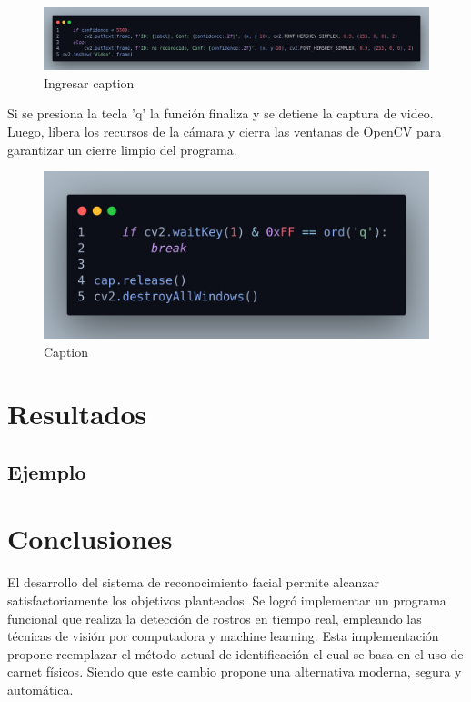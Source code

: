 \documentclass[12pt]{article}
\begin{document}
{\begin{figure}[h]
    \centering
    \includegraphics[width=1.0\linewidth]{imagenes/des26.png}
    \caption{Ingresar caption}
    \label{fig:enter-label}
\end{figure}

Si se presiona la tecla 'q' la función finaliza y se detiene la captura de video.  Luego, libera los recursos de la cámara y cierra las ventanas de OpenCV para garantizar un cierre limpio del programa.

\begin{figure}[h]
    \centering
    \includegraphics[width=0.75\linewidth]{imagenes/des27.png}
    \caption{Caption}
    \label{fig:enter-label}
\end{figure}


\section{Resultados}
\subsection{Ejemplo}


\section{Conclusiones}
El desarrollo del sistema de reconocimiento facial permite alcanzar satisfactoriamente los objetivos planteados. Se logró implementar un programa funcional que realiza la detección de rostros en tiempo real, empleando las técnicas de visión por computadora y machine learning. Esta implementación propone reemplazar el método actual de identificación el cual se basa en el uso de carnet físicos. Siendo que este cambio propone una alternativa moderna, segura y automática.

}
\end{document}
